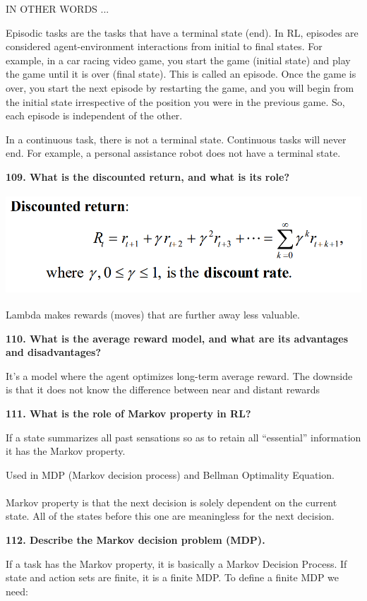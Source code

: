 IN OTHER WORDS ...

Episodic tasks are the tasks that have a terminal state (end). In RL,
episodes are considered agent-environment interactions from initial to
final states. For example, in a car racing video game, you start the
game (initial state) and play the game until it is over (final state).
This is called an episode. Once the game is over, you start the next
episode by restarting the game, and you will begin from the initial
state irrespective of the position you were in the previous game. So,
each episode is independent of the other.

In a continuous task, there is not a terminal state. Continuous tasks
will never end. For example, a personal assistance robot does not have a
terminal state.

\textbf{109. What is the discounted return, and what is its role?}

\includegraphics[width=5.49479in,height=1.48779in]{media/image26.png}

Lambda makes rewards (moves) that are further away less valuable.

\textbf{110. What is the average reward model, and what are its
advantages and disadvantages?}

It's a model where the agent optimizes long-term average reward. The
downside is that it does not know the difference between near and
distant rewards

\textbf{111. What is the role of Markov property in RL?}

If a state summarizes all past sensations so as to retain all
``essential'' information it has the Markov property.

Used in MDP (Markov decision process) and Bellman Optimality Equation.\\
~\\
Markov property is that the next decision is solely dependent on the
current state. All of the states before this one are meaningless for the
next decision.

\textbf{112. Describe the Markov decision problem (MDP).}

If a task has the Markov property, it is basically a Markov Decision
Process. If state and action sets are finite, it is a finite MDP. To
define a finite MDP we need:

